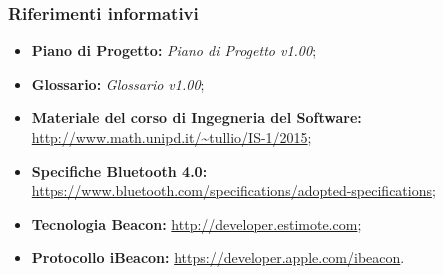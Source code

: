 \documentclass[../nStudioDiFattibilita.tex]{subfiles}
\begin{document}
		\subsubsection{Riferimenti informativi}
		\begin{itemize}
			\item \textbf{Piano di Progetto:} \textit{Piano di Progetto v1.00};
			\item \textbf{Glossario:} \textit{Glossario v1.00};
			\item \textbf{Materiale del corso di Ingegneria del Software:}\\\url{http://www.math.unipd.it/~tullio/IS-1/2015};
			\item \textbf{Specifiche Bluetooth 4.0:}\\\url{https://www.bluetooth.com/specifications/adopted-specifications};
			\item \textbf{Tecnologia Beacon:} \url{http://developer.estimote.com};
			\item \textbf{Protocollo iBeacon:} \url{https://developer.apple.com/ibeacon}.
		\end{itemize}
\end{document}
